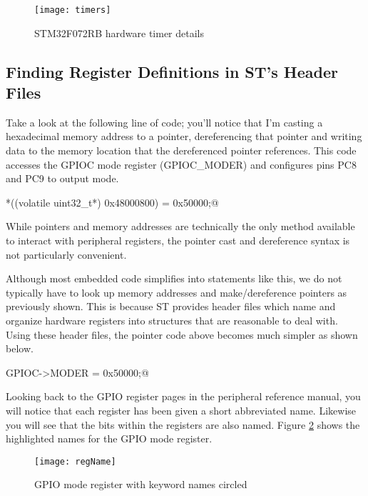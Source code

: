 \documentclass[11pt,fleqn]{book} %
\makeatletter
\newcommand{\ilcode}[1]{
    \smallskip
    \colorbox{gray!20!white}{
        \centering
        \parbox{\linewidth-2\fboxsep}{
            \lstinline@#1@
        }
    }
}
\makeatother
\begin{document}
\begin{figure}[]
    \centering\texttt{[image: timers]}
    \caption{STM32F072RB hardware timer details}
    \label{timers}
\end{figure}

\subsection{Finding Register Definitions in ST's Header Files}

Take a look at the following line of code; you'll notice that I'm casting a hexadecimal memory address to a pointer, dereferencing that pointer and writing data to the memory location that the dereferenced pointer references. This code accesses the GPIOC mode register (GPIOC\_MODER) and configures pins PC8 and PC9 to output mode.

\ilcode{*((volatile uint32\_t*) 0x48000800) = 0x50000;}%
\smallskip

While pointers and memory addresses are technically the only method available to interact with peripheral registers, the pointer cast and dereference syntax is not particularly convenient.

Although most embedded code simplifies into statements like this, we do not typically have to look up memory addresses and make/dereference pointers as previously shown. This is because ST provides header files which name and organize hardware registers into structures that are reasonable to deal with. Using these header files, the pointer code above becomes much simpler as shown below.

\ilcode{GPIOC->MODER = 0x50000;}%
\smallskip


Looking back to the GPIO register pages in the peripheral reference manual, you will notice that each register has been given a short abbreviated name. Likewise you will see that the bits within the registers are also named. Figure \ref{regName} shows the highlighted names for the GPIO mode register. 

\begin{figure}[]
    \centering\texttt{[image: regName]}
    \caption{GPIO mode register with keyword names circled}
    \label{regName}
\end{figure}
\end{document}
